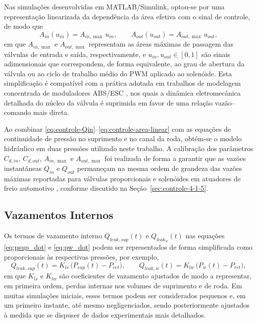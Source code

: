 Nas simulações desenvolvidas em MATLAB/Simulink, optou-se por uma representação linearizada da dependência da área efetiva com o sinal de controle, de modo que
\begin{equation}
    A_{in}(u_{in}) = A_{in,\max}\,u_{in}, \qquad
    A_{out}(u_{out}) = A_{out,\max}\,u_{out},
    \label{eq:controle-area-linear}
\end{equation}
em que $A_{in,\max}$ e $A_{out,\max}$ representam as áreas máximas de passagem das válvulas de entrada e saída, respectivamente, e $u_{in},u_{out} \in [0,1]$ são sinais adimensionais que correspondem, de forma equivalente, ao grau de abertura da válvula ou ao ciclo de trabalho médio do PWM aplicado ao solenóide. Esta simplificação é compatível com a prática adotada em trabalhos de modelagem concentrada de moduladores ABS/ESC \cite{Lv2014,ChenLv2017}, nos quais a dinâmica eletromecânica detalhada do núcleo da válvula é suprimida em favor de uma relação vazão–comando mais direta.

Ao combinar \eqref{eq:controle-Qin}–\eqref{eq:controle-area-linear} com as equações de continuidade de pressão no suprimento e no canal da roda, obtém-se o modelo hidráulico em duas pressões utilizado neste trabalho. A calibração dos parâmetros $C_{d,in}$, $C_{d,out}$, $A_{in,\max}$ e $A_{out,\max}$ foi realizada de forma a garantir que as vazões instantâneas $Q_{in}$ e $Q_{out}$ permaneçam na mesma ordem de grandeza das vazões máximas reportadas para válvulas proporcionais e solenóides em atuadores de freio automotivo \cite{ProportionalPressureABS2023,ChenLv2017}, conforme discutido na Seção~\ref{sec:controle-4-1-5}.

\subsection{Vazamentos Internos}
\label{sec:controle-vazamentos-internos}
\label{sec:controle-4-1-5}

Os termos de vazamento interno $Q_{leak,sup}(t)$ e $Q_{leak_w}(t)$ nas equações \eqref{eq:psup_dot} e \eqref{eq:pw_dot} podem ser representados de forma simplificada como proporcionais às respectivas pressões, por exemplo,
\begin{equation}
    Q_{leak,sup}(t) = K_{ls}\,\big(P_{sup}(t) - P_{ret}\big), 
    \qquad
    Q_{leak,w}(t) = K_{lw}\,\big(P_{w}(t) - P_{ret}\big),
    \label{eq:leaks_2p}
\end{equation}
em que $K_{ls}$ e $K_{lw}$ são coeficientes de vazamento ajustados de modo a representar, em primeira ordem, perdas internas nos volumes de suprimento e de roda. Em muitas simulações iniciais, esses termos podem ser considerados pequenos e, em um primeiro instante, até mesmo negligenciados, sendo posteriormente ajustados à medida que se dispuser de dados experimentais mais detalhados.

